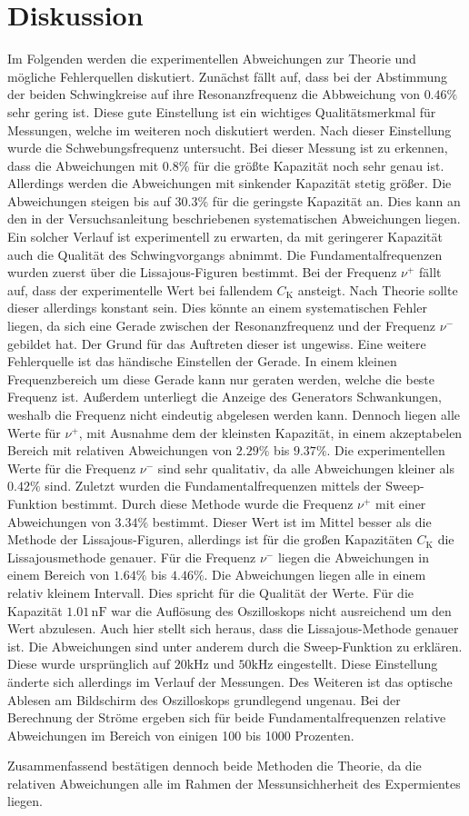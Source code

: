 \section{Diskussion}
\label{sec:Diskussion}
Im Folgenden werden die experimentellen Abweichungen zur Theorie und mögliche Fehlerquellen diskutiert.
Zunächst fällt auf, dass bei der Abstimmung der beiden Schwingkreise auf ihre Resonanzfrequenz die Abbweichung von $0.46\%$ sehr gering ist. Diese gute Einstellung ist ein wichtiges Qualitätsmerkmal
für Messungen, welche im weiteren noch diskutiert werden. Nach dieser Einstellung wurde die Schwebungsfrequenz untersucht. Bei dieser Messung ist zu erkennen, dass die Abweichungen mit $0.8\%$ für
die größte Kapazität noch sehr genau ist. Allerdings werden die Abweichungen mit sinkender Kapazität stetig größer. Die Abweichungen steigen bis auf $30.3\%$ für die geringste Kapazität an. Dies 
kann an den in der Versuchsanleitung \cite{v355} beschriebenen systematischen Abweichungen liegen. Ein solcher Verlauf ist experimentell zu erwarten, da mit geringerer Kapazität 
auch die Qualität des Schwingvorgangs abnimmt. Die Fundamentalfrequenzen wurden zuerst über die Lissajous-Figuren bestimmt. Bei der Frequenz $\nu^+$ fällt auf, dass der experimentelle Wert
bei fallendem $C_\text{K}$ ansteigt. Nach Theorie sollte dieser allerdings konstant sein. Dies könnte an einem systematischen Fehler liegen, da sich eine Gerade zwischen der Resonanzfrequenz und der Frequenz
$\nu^-$ gebildet hat. Der Grund für das Auftreten dieser ist ungewiss. Eine weitere Fehlerquelle ist das händische Einstellen der Gerade. In einem kleinen Frequenzbereich um diese Gerade kann nur geraten werden, 
welche die beste Frequenz ist. Außerdem unterliegt die Anzeige des Generators Schwankungen, weshalb die Frequenz nicht eindeutig abgelesen werden kann. Dennoch liegen alle Werte
für $\nu^+$, mit Ausnahme dem der kleinsten Kapazität, in einem akzeptabelen Bereich mit relativen Abweichungen von $2.29\%$ bis $9.37\%$. Die experimentellen Werte für die Frequenz $\nu^-$ sind sehr 
qualitativ, da alle Abweichungen kleiner als $0.42\%$ sind. Zuletzt wurden die Fundamentalfrequenzen mittels der Sweep-Funktion bestimmt. Durch diese Methode wurde die Frequenz $\nu^+$ mit einer 
Abweichungen von $3.34\%$ bestimmt. Dieser Wert ist im Mittel besser als die Methode der Lissajous-Figuren, allerdings ist für die großen Kapazitäten
$C_\text{K}$ die Lissajousmethode genauer. Für die Frequenz $\nu^-$ liegen die Abweichungen in einem Bereich von $1.64\%$ bis $4.46\%$. Die Abweichungen liegen alle in einem relativ kleinem Intervall. 
Dies spricht für die Qualität der Werte. Für die Kapazität $1.01\, \unit{\nano\farad}$ war die Auflösung des Oszilloskops nicht ausreichend um den Wert abzulesen. Auch hier stellt sich heraus, 
dass die Lissajous-Methode 
genauer ist. Die Abweichungen sind unter anderem durch die Sweep-Funktion zu erklären. Diese wurde ursprünglich auf $20 \unit{\kilo\hertz}$ und $50 \unit{\kilo\hertz}$ eingestellt. 
Diese Einstellung änderte sich allerdings im Verlauf der Messungen. Des Weiteren ist das optische Ablesen am Bildschirm des Oszilloskops grundlegend ungenau.
Bei der Berechnung der Ströme ergeben sich für beide Fundamentalfrequenzen relative Abweichungen im Bereich von einigen 100 bis 1000 Prozenten. 

Zusammenfassend bestätigen dennoch beide Methoden die Theorie, da die relativen Abweichungen alle im Rahmen der Messunsichherheit des Expermientes liegen.
